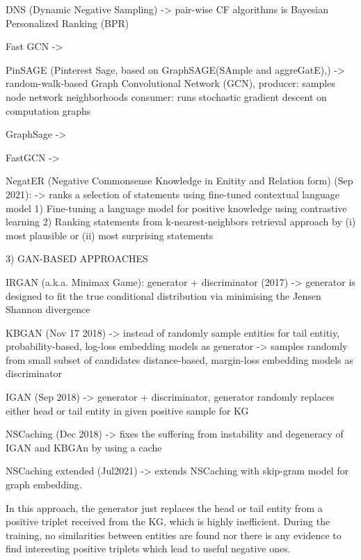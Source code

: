    DNS (Dynamic Negative Sampling)
         -> pair-wise CF algorithms is Bayesian Personalized Ranking (BPR)

    Fast GCN
        ->
        
    PinSAGE (Pinterest Sage, based on GraphSAGE(SAmple and aggreGatE),)
        -> random-walk-based Graph Convolutional Network (GCN),
        producer: samples node network neighborhoods
        consumer: runs stochastic gradient descent on computation graphs    

    GraphSage
        ->
        
    FastGCN
        -> 

    NegatER (Negative Commonsense Knowledge in Enitity and Relation form) (Sep 2021):
        -> ranks a selection of statements using fine-tuned contextual language model
        1) Fine-tuning a language model for positive knowledge using contrastive learning
        2) Ranking statements from k-nearest-neighbors retrieval approach by (i) most plausible or (ii) most surprising statements
    
    
    
    
3) GAN-BASED APPROACHES
    
    IRGAN (a.k.a. Minimax Game): generator + discriminator  (2017) 
        -> generator is designed to fit the true conditional distribution via minimising the Jensen Shannon divergence
    
    KBGAN (Nov 17 2018)
        -> instead of randomly sample entities for tail entitiy,
        probability-based, log-loss embedding models as generator
        -> samples randomly from small subset of candidates
        distance-based, margin-loss embedding models as discriminator
    
    IGAN (Sep 2018) 
        -> generator + discriminator, generator randomly replaces either head or tail entity in given positive sample for KG
    
    NSCaching (Dec 2018)
        -> fixes the suffering from instability and degeneracy of IGAN and KBGAn by using a cache

    NSCaching extended (Jul2021)
        ->  extends NSCaching with skip-gram model for graph embedding. 
    
    
    
In this approach, the generator just replaces the head or tail entity from a positive triplet received from the \ac{KG}, which is highly inefficient.
    During the training, no similarities between entities are found nor there is any evidence to find interesting positive triplets which lead to useful negative ones.
    
